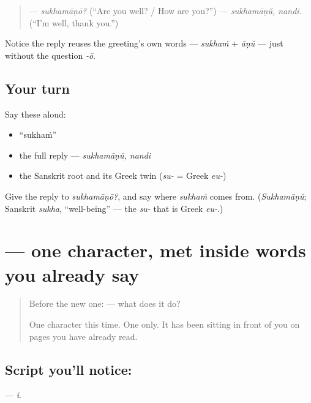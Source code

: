 \begin{quote}
— \emph{sukhamāṇō?} (\textquotedblleft{}Are you well? / How are you?\textquotedblright{}) — \emph{sukhamāṇŭ, nandi.} (\textquotedblleft{}I'm well, thank you.\textquotedblright{})
\end{quote}

Notice the reply reuses the greeting's own words — \emph{sukhaṁ} + \emph{āṇŭ} — just without the question \emph{-ō}.

\subsection*{Your turn}
Say these aloud:

\begin{itemize}
\raggedright
  \item \textquotedblleft{}sukhaṁ\textquotedblright{}
  \item the full reply — \emph{sukhamāṇŭ, nandi}
  \item the Sanskrit root and its Greek twin (\emph{su-} = Greek \emph{eu-})
\end{itemize}

\begin{tcolorbox}[breakable,colback=teal!4,colframe=teal!35!black,title={Before you move on}]
Give the reply to \emph{sukhamāṇō?}, and say where \emph{sukhaṁ} comes from. (\emph{Sukhamāṇŭ}; Sanskrit \emph{sukha}, \textquotedblleft{}well-being\textquotedblright{} — the \emph{su-} that is Greek \emph{eu-}.)
\end{tcolorbox}
\section[\texorpdfstring{\ml{ഇ} (i)}{ഇ (i)}]{ — one character, met inside words you already say}

\label{lesson:ML-S140-letter-i}



\begin{quote}
Before the new one:  — what does it do?

One character this time. One only. It has been sitting in front of you on pages you have already read.
\end{quote}

\subsection*{Script you'll notice: }
\textbf{} — \emph{i}.

